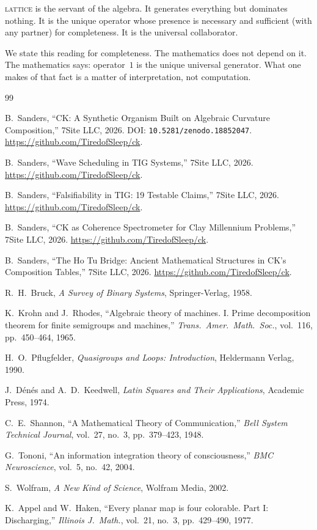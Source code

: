\documentclass[11pt,a4paper]{article}
\theoremstyle{definition}
\theoremstyle{remark}
\begin{document}
\textsc{lattice} is the servant of the algebra. It generates everything but dominates nothing. It is the unique operator whose presence is necessary and sufficient (with any partner) for completeness. It is the universal collaborator.

We state this reading for completeness. The mathematics does not depend on it. The mathematics says: operator~$1$ is the unique universal generator. What one makes of that fact is a matter of interpretation, not computation.

\begin{thebibliography}{99}

B.~Sanders,
``CK: A Synthetic Organism Built on Algebraic Curvature Composition,''
7Site LLC, 2026.
DOI: \texttt{10.5281/zenodo.18852047}.
\url{https://github.com/TiredofSleep/ck}.

B.~Sanders,
``Wave Scheduling in TIG Systems,''
7Site LLC, 2026.
\url{https://github.com/TiredofSleep/ck}.

B.~Sanders,
``Falsifiability in TIG: 19 Testable Claims,''
7Site LLC, 2026.
\url{https://github.com/TiredofSleep/ck}.

B.~Sanders,
``CK as Coherence Spectrometer for Clay Millennium Problems,''
7Site LLC, 2026.
\url{https://github.com/TiredofSleep/ck}.

B.~Sanders,
``The Ho Tu Bridge: Ancient Mathematical Structures in CK's Composition Tables,''
7Site LLC, 2026.
\url{https://github.com/TiredofSleep/ck}.

R.~H.~Bruck,
\emph{A Survey of Binary Systems},
Springer-Verlag, 1958.

K.~Krohn and J.~Rhodes,
``Algebraic theory of machines. I. Prime decomposition theorem for finite semigroups and machines,''
\emph{Trans.\ Amer.\ Math.\ Soc.}, vol.~116, pp.~450--464, 1965.

H.~O.~Pflugfelder,
\emph{Quasigroups and Loops: Introduction},
Heldermann Verlag, 1990.

J.~D\'en\'es and A.~D.~Keedwell,
\emph{Latin Squares and Their Applications},
Academic Press, 1974.

C.~E.~Shannon,
``A Mathematical Theory of Communication,''
\emph{Bell System Technical Journal}, vol.~27, no.~3, pp.~379--423, 1948.

G.~Tononi,
``An information integration theory of consciousness,''
\emph{BMC Neuroscience}, vol.~5, no.~42, 2004.

S.~Wolfram,
\emph{A New Kind of Science},
Wolfram Media, 2002.

K.~Appel and W.~Haken,
``Every planar map is four colorable. Part I: Discharging,''
\emph{Illinois J.\ Math.}, vol.~21, no.~3, pp.~429--490, 1977.

\end{thebibliography}
\end{document}
